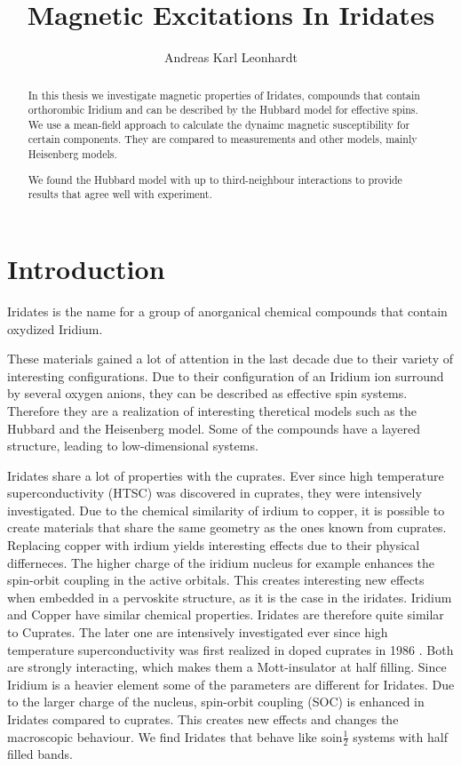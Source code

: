 \documentclass[a4paper,10pt]{report}
\title{Magnetic Excitations In Iridates}
\author{Andreas Karl Leonhardt}
\begin{document}

\begin{abstract}
In this thesis we investigate magnetic properties of Iridates, 
compounds that contain orthorombic Iridium and can be described by the Hubbard model for effective spins.
We use a mean-field approach to calculate the dynaimc magnetic susceptibility for certain components.
They are compared to measurements and other models, mainly Heisenberg models. 

We found the Hubbard model with up to third-neighbour interactions to provide results that agree well with experiment.
\end{abstract}


\tableofcontents

\chapter{Introduction}

Iridates is the name for a group of anorganical chemical compounds that contain oxydized Iridium.

These materials gained a lot of attention in the last decade due to their variety of interesting configurations.
Due to their configuration of an Iridium ion surround by several oxygen anions, they can be described as effective spin systems.
Therefore they are a realization of interesting theretical models such as the Hubbard and the Heisenberg model.
Some of the compounds have a layered structure, leading to low-dimensional systems.


Iridates share a lot of properties with the cuprates. 
Ever since high temperature superconductivity (HTSC) was discovered in cuprates, 
they were intensively investigated. 
Due to the chemical similarity of irdium to copper, it is possible to create materials that share the same geometry as the ones known from cuprates.
Replacing copper with irdium yields interesting effects due to their physical differneces.
The higher charge of the iridium nucleus for example enhances the spin-orbit coupling in the active orbitals.
This creates interesting new effects when embedded in a pervoskite structure, as it is the case in the iridates.
%
%
Iridium and Copper have similar chemical properties. 
Iridates are therefore quite similar to Cuprates. 
The later one are intensively investigated ever since high temperature superconductivity was first realized in doped cuprates in 1986 \cite{}.
Both are strongly interacting, which makes them a Mott-insulator at half filling.
Since Iridium is a heavier element some of the parameters are different for Iridates. 
Due to the larger charge of the nucleus, spin-orbit coupling (SOC) is enhanced in Iridates compared to cuprates.
This creates new effects and changes the macroscopic behaviour. 
We find Iridates that behave like soin$\frac12$ systems with half filled bands. 
\end{document}
